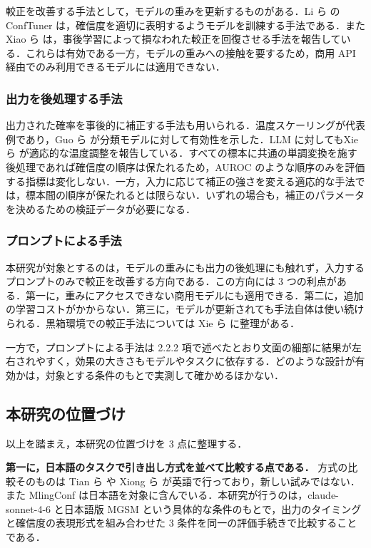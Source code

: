 較正を改善する手法として，モデルの重みを更新するものがある．Li ら \cite{li2025conftuner} のConfTuner は，確信度を適切に表明するようモデルを訓練する手法である．またXiao ら \cite{xiao2025restoringcalibration} は，事後学習によって損なわれた較正を回復させる手法を報告している．これらは有効である一方，モデルの重みへの接触を要するため，商用 API経由でのみ利用できるモデルには適用できない．

\subsubsection{出力を後処理する手法}

出力された確率を事後的に補正する手法も用いられる．温度スケーリングが代表例であり，Guo ら \cite{guo2017calibration} が分類モデルに対して有効性を示した．LLM に対してもXie ら \cite{xie2024adaptivetemp} が適応的な温度調整を報告している．すべての標本に共通の単調変換を施す後処理であれば確信度の順序は保たれるため，AUROC のような順序のみを評価する指標は変化しない．一方，入力に応じて補正の強さを変える適応的な手法では，標本間の順序が保たれるとは限らない．いずれの場合も，補正のパラメータを決めるための検証データが必要になる．

\subsubsection{プロンプトによる手法}

本研究が対象とするのは，モデルの重みにも出力の後処理にも触れず，入力するプロンプトのみで較正を改善する方向である．この方向には 3 つの利点がある．第一に，重みにアクセスできない商用モデルにも適用できる．第二に，追加の学習コストがかからない．第三に，モデルが更新されても手法自体は使い続けられる．黒箱環境での較正手法については Xie ら \cite{xie2024blackboxsurvey} に整理がある．

一方で，プロンプトによる手法は 2.2.2 項で述べたとおり文面の細部に結果が左右されやすく，効果の大きさもモデルやタスクに依存する．どのような設計が有効かは，対象とする条件のもとで実測して確かめるほかない．

\subsection{本研究の位置づけ}

以上を踏まえ，本研究の位置づけを 3 点に整理する．

\textbf{第一に，日本語のタスクで引き出し方式を並べて比較する点である．} 方式の比較そのものは Tian ら \cite{tian2023justask} や Xiong ら \cite{xiong2024llmuncertainty} が英語で行っており，新しい試みではない．また MlingConf は日本語を対象に含んでいる．本研究が行うのは，claude-sonnet-4-6 と日本語版 MGSM という具体的な条件のもとで，出力のタイミングと確信度の表現形式を組み合わせた 3 条件を同一の評価手続きで比較することである．

